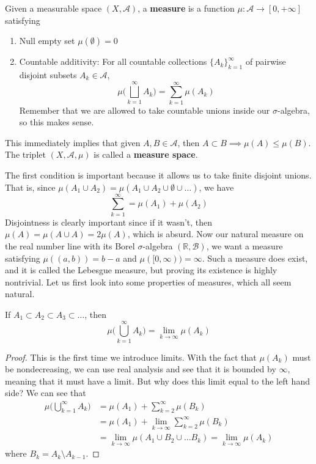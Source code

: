 \documentclass{article}
\begin{document}
\begin{definition}[Measure]
  Given a measurable space $(X, \mathcal{A})$, a \textbf{measure} is a function $\mu : \mathcal{A} \longrightarrow [0, +\infty]$ satisfying 
  \begin{enumerate}
    \item Null empty set $\mu(\emptyset) = 0$ 
    \item Countable additivity: For all countable collections $\{A_k\}_{k=1}^\infty$ of pairwise disjoint subsets $A_k \in \mathcal{A}$, 
    \[\mu \bigg( \bigsqcup_{k=1}^\infty A_k \bigg) = \sum_{k=1}^\infty \mu(A_k)\]
    Remember that we are allowed to take countable unions inside our $\sigma$-algebra, so this makes sense. 
  \end{enumerate}
  This immediately implies that given $A, B \in \mathcal{A}$, then $A \subset B \implies \mu(A) \leq \mu(B)$. The triplet $(X, \mathcal{A}, \mu)$ is called a \textbf{measure space}. 
\end{definition}

The first condition is important because it allows us to take finite disjoint unions. That is, since $\mu(A_1 \cup A_2) = \mu(A_1 \cup A_2 \cup \emptyset \cup \ldots)$, we have 
\[\sum_{k=1}^\infty = \mu(A_1) + \mu(A_2)\]
Disjointness is clearly important since if it wasn't, then $\mu(A) = \mu(A \cup A) = 2 \mu(A)$, which is absurd. Now our natural measure on the real number line with its Borel $\sigma$-algebra $(\mathbb{R}, \mathcal{B})$, we want a measure satisfying $\mu((a, b)) = b - a$ and $\mu([0, \infty)) = \infty$. Such a measure does exist, and it is called the Lebesgue measure, but proving its existence is highly nontrivial. Let us first look into some properties of measures, which all seem natural. 

\begin{proposition}
  If $A_1 \subset A_2 \subset A_3 \subset \ldots$, then 
  \[\mu\bigg( \bigcup_{k=1}^\infty A_k \bigg) = \lim_{k \rightarrow \infty} \mu(A_k)\]
\end{proposition}
\begin{proof}
  This is the first time we introduce limits. With the fact that $\mu(A_k)$ must be nondecreasing, we can use real analysis and see that it is bounded by $\infty$, meaning that it must have a limit. But why does this limit equal to the left hand side? We can see that 
  \begin{align}
    \mu\bigg( \bigcup_{k=1}^\infty A_k \bigg) & = \mu(A_1) + \sum_{k=2}^\infty \mu(B_k) \\
    & = \mu(A_1) + \lim_{k \rightarrow \infty} \sum_{k=2}^\infty \mu(B_k) \\
    & = \lim_{k \rightarrow \infty} \mu(A_1 \cup B_2 \cup \ldots B_k)  = \lim_{k \rightarrow \infty} \mu(A_k) 
  \end{align}
  where $B_k = A_k \setminus A_{k-1}$. 
\end{proof}
\end{document}
